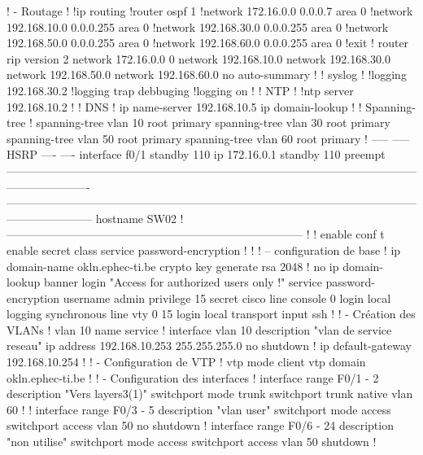 \documentclass{article}
\begin{document}
{\begin{verbatimtab}[4]
! - Routage
!
!ip routing
!router ospf 1
!network 172.16.0.0 0.0.0.7 area 0
!network 192.168.10.0 0.0.0.255 area 0
!network 192.168.30.0 0.0.0.255 area 0
!network 192.168.50.0 0.0.0.255 area 0 
!network 192.168.60.0 0.0.0.255 area 0 
!exit      
!   
router rip
version 2 
network 172.16.0.0 0
network 192.168.10.0 
network 192.168.30.0 
network 192.168.50.0  
network 192.168.60.0
no auto-summary
!
! syslog
!
!logging 192.168.30.2
!logging trap debbuging
!logging on
!
! NTP
!
!ntp server 192.168.10.2
! 
! DNS
!
ip name-server 192.168.10.5
ip domain-lookup
!
! Spanning-tree
!
spanning-tree vlan 10 root primary  
spanning-tree vlan 30 root primary 
spanning-tree vlan 50 root primary
spanning-tree vlan 60 root primary  
!
-----
-----
HSRP
----
----
interface f0/1
standby 110 ip 172.16.0.1
standby 110 preempt
----------------------------------------------------------------------------------------------------------------------------------
-----------------------------------------------------------------------------------------------------------------------------------
hostname SW02
! ------------------------------------------------------------------------------
!
!
enable
conf t
enable secret class 
service password-encryption
!
!
! – configuration de base 
!
ip domain-name okln.ephec-ti.be
crypto key generate rsa
2048
!
no ip domain-lookup
banner login "Access for authorized users only !"
service password-encryption
username admin privilege 15 secret cisco
line console 0
  login local
  logging synchronous
line vty 0 15
  login local 
  transport input ssh
!
! - Création des VLANs
!
vlan 10
  name service
!
interface vlan 10
  description "vlan de service reseau"
  ip address 192.168.10.253 255.255.255.0
  no shutdown
!
ip default-gateway 192.168.10.254
!
! - Configuration de VTP
!
vtp mode client
vtp domain okln.ephec-ti.be
!
! - Configuration des interfaces
!       
interface range F0/1 - 2
  description "Vers layers3(1)"
  switchport mode trunk
  switchport trunk native vlan 60
! 
!
interface range F0/3 - 5
  description "vlan user"
  switchport mode access
  switchport access vlan 50
   no shutdown
!
interface range F0/6 - 24
  description "non utilise"
  switchport mode access
  switchport access vlan 50
  shutdown
!


\end{verbatimtab}}
\end{document}

